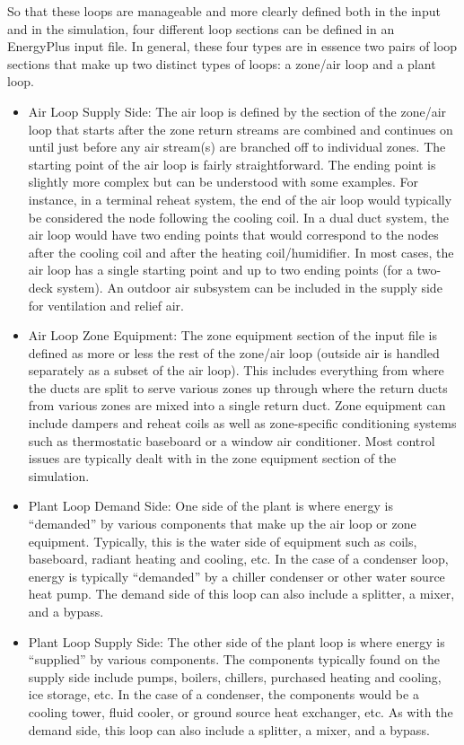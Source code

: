 So that these loops are manageable and more clearly defined both in
the input and in the simulation, four different loop sections can
be defined in an EnergyPlus input file. In general, these four types
are in essence two pairs of loop sections that make up two distinct
types of loops: a zone/air loop and a plant loop.
\begin{itemize}
\item Air Loop Supply Side: The air loop is defined by the section of the
zone/air loop that starts after the zone return streams are combined
and continues on until just before any air stream(s) are branched
off to individual zones. The starting point of the air loop is fairly
straightforward. The ending point is slightly more complex but can
be understood with some examples. For instance, in a terminal reheat
system, the end of the air loop would typically be considered the
node following the cooling coil. In a dual duct system, the air loop
would have two ending points that would correspond to the nodes after
the cooling coil and after the heating coil/humidifier. In most cases,
the air loop has a single starting point and up to two ending points
(for a two-deck system). An outdoor air subsystem can be included
in the supply side for ventilation and relief air.
\item Air Loop Zone Equipment: The zone equipment section of the input file
is defined as more or less the rest of the zone/air loop (outside
air is handled separately as a subset of the air loop). This includes
everything from where the ducts are split to serve various zones up
through where the return ducts from various zones are mixed into a
single return duct. Zone equipment can include dampers and reheat
coils as well as zone-specific conditioning systems such as thermostatic
baseboard or a window air conditioner. Most control issues are typically
dealt with in the zone equipment section of the simulation.
\item Plant Loop Demand Side: One side of the plant is where energy is \textquotedblleft demanded\textquotedblright{}
by various components that make up the air loop or zone equipment.
Typically, this is the water side of equipment such as coils, baseboard,
radiant heating and cooling, etc. In the case of a condenser loop,
energy is typically \textquotedblleft demanded\textquotedblright{}
by a chiller condenser or other water source heat pump. The demand
side of this loop can also include a splitter, a mixer, and a bypass.
\item Plant Loop Supply Side: The other side of the plant loop is where
energy is \textquotedblleft supplied\textquotedblright{} by various
components. The components typically found on the supply side include
pumps, boilers, chillers, purchased heating and cooling, ice storage,
etc. In the case of a condenser, the components would be a cooling
tower, fluid cooler, or ground source heat exchanger, etc. As with
the demand side, this loop can also include a splitter, a mixer, and
a bypass.
\end{itemize}

